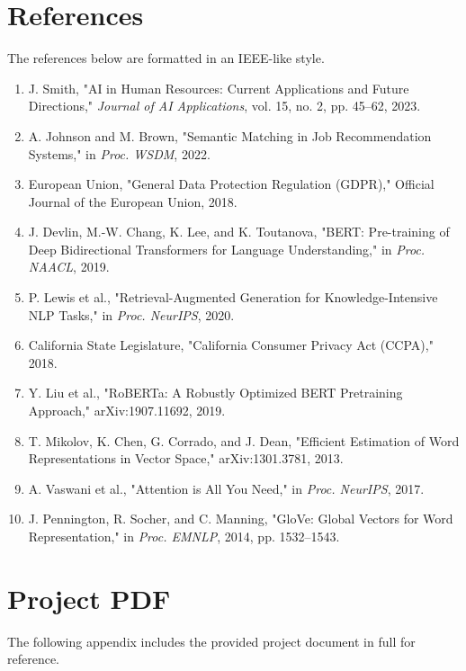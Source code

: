 \documentclass[12pt,a4paper]{report}
\begin{document}
\chapter{References}
\noindent The references below are formatted in an IEEE-like style.
\begin{enumerate}[leftmargin=2em]
  \item J. Smith, "AI in Human Resources: Current Applications and Future Directions," \textit{Journal of AI Applications}, vol. 15, no. 2, pp. 45--62, 2023.
  \item A. Johnson and M. Brown, "Semantic Matching in Job Recommendation Systems," in \textit{Proc. WSDM}, 2022.
  \item European Union, "General Data Protection Regulation (GDPR)," Official Journal of the European Union, 2018.
  \item J. Devlin, M.-W. Chang, K. Lee, and K. Toutanova, "BERT: Pre-training of Deep Bidirectional Transformers for Language Understanding," in \textit{Proc. NAACL}, 2019.
  \item P. Lewis et al., "Retrieval-Augmented Generation for Knowledge-Intensive NLP Tasks," in \textit{Proc. NeurIPS}, 2020.
  \item California State Legislature, "California Consumer Privacy Act (CCPA)," 2018.
  \item Y. Liu et al., "RoBERTa: A Robustly Optimized BERT Pretraining Approach," arXiv:1907.11692, 2019.
  \item T. Mikolov, K. Chen, G. Corrado, and J. Dean, "Efficient Estimation of Word Representations in Vector Space," arXiv:1301.3781, 2013.
  \item A. Vaswani et al., "Attention is All You Need," in \textit{Proc. NeurIPS}, 2017.
  \item J. Pennington, R. Socher, and C. Manning, "GloVe: Global Vectors for Word Representation," in \textit{Proc. EMNLP}, 2014, pp. 1532--1543.
\end{enumerate}

\appendix
\chapter{Project PDF}
\label{app:project-pdf}
The following appendix includes the provided project document in full for reference.

\end{document}
